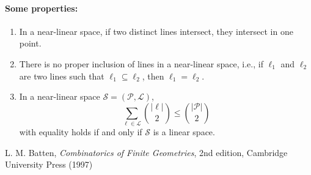\documentclass[12pt]{article}
\begin{document}
\paragraph{Some properties:}
\begin{enumerate}
\item In a near-linear space, if two distinct lines intersect, they intersect in one point.

\item There is no proper inclusion of lines in a near-linear space, i.e., if $\ell_1$ and $\ell_2$ are two lines such that $\ell_1\subseteq \ell_2$, then $\ell_1=\ell_2$.

\item In a near-linear space $\mathscr{S}=(\mathcal{P},\mathcal{L})$, 
$$\sum_{\ell \in \mathcal{L}} \binom{|\ell|}{2} \leq \binom{|\mathcal{P}|}{2}$$
with equality holds if and only if $\mathscr{S}$ is a linear space.
\end{enumerate}

\begin{thebibliography}{7}
 L. M. Batten, {\it Combinatorics of Finite Geometries}, 2nd edition, Cambridge University Press (1997)
\end{thebibliography}
\end{document}
